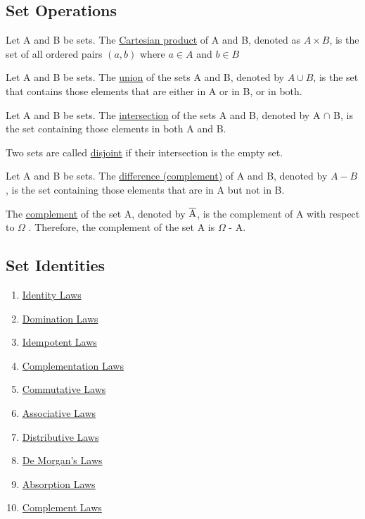 \documentclass[12pt]{article}
\begin{document}
\quad

\quad

\subsection{Set Operations}

\quad

\noindent Let A and B be sets. The \underline{Cartesian product} of A and B, denoted as $ A \times B $, is the set of all \indent ordered pairs $(a, b)$ where $ a \in A$ and $b \in B$

\quad

\noindent Let A and B be sets. The \underline{union} of the sets A and B, denoted by $A \cup B$, is the set that \indent contains those elements that are either in A or in B, or in both.

\quad

\noindent Let A and B be sets. The \underline{intersection} of the sets A and B, denoted by A $ \cap $ B, is the set \indent containing those elements in both A and B.

\quad

\noindent Two sets are called \underline{disjoint} if their intersection is the empty set.

\quad

\noindent Let A and B be sets. The \underline{difference (complement)} of A and B, denoted by $A - B$, is the set \indent containing those elements that are in A but not in B.

\quad

\noindent The \underline{complement} of the set A, denoted by $\overline{\rm A}$, is the complement of A with respect to $\Omega$ . \indent Therefore, the complement of the set A is $\Omega$ - A.

\quad

\subsection{Set Identities}

\begin{enumerate}
\item \underline{Identity Laws}
\item \underline{Domination Laws}
\item \underline{Idempotent Laws}
\item \underline{Complementation Laws}
\item \underline{Commutative Laws}
\item \underline{Associative Laws}
\item \underline{Distributive Laws}
\item \underline{De Morgan's Laws}
\item \underline{Absorption Laws}
\item \underline{Complement Laws}
\end{enumerate}
\end{document}
